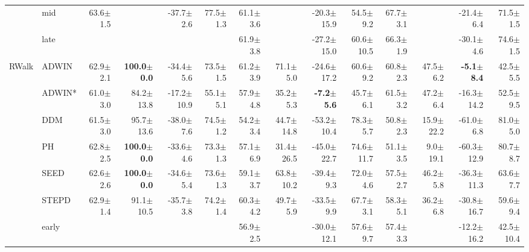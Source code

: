 \begin{tabular}{llrrrrrrrrrrrr}
 & mid & 63.6\tiny{$\pm$1.5} &  & -37.7\tiny{$\pm$2.6} & 77.5\tiny{$\pm$1.3} & 61.1\tiny{$\pm$3.6} &  & -20.3\tiny{$\pm$15.9} & 54.5\tiny{$\pm$9.2} & 67.7\tiny{$\pm$3.1} &  & -21.4\tiny{$\pm$6.4} & 71.5\tiny{$\pm$1.5} \\
 & late &  &  &  &  & 61.9\tiny{$\pm$3.8} &  & -27.2\tiny{$\pm$15.0} & 60.6\tiny{$\pm$10.5} & 66.3\tiny{$\pm$1.9} &  & -30.1\tiny{$\pm$4.6} & 74.6\tiny{$\pm$1.5} \\
\midrule
\multirow[t]{9}{*}{RWalk} & ADWIN & 62.9\tiny{$\pm$2.1} & \textbf{100.0\tiny{$\pm$0.0}} & -34.4\tiny{$\pm$5.6} & 73.5\tiny{$\pm$1.5} & 61.2\tiny{$\pm$3.9} & 71.1\tiny{$\pm$5.0} & -24.6\tiny{$\pm$17.2} & 60.6\tiny{$\pm$9.2} & 60.8\tiny{$\pm$2.3} & 47.5\tiny{$\pm$6.2} & \textbf{-5.1\tiny{$\pm$8.4}} & 42.5\tiny{$\pm$5.5} \\
 & ADWIN* & 61.0\tiny{$\pm$3.0} & 84.2\tiny{$\pm$13.8} & -17.2\tiny{$\pm$10.9} & 55.1\tiny{$\pm$5.1} & 57.9\tiny{$\pm$4.8} & 35.2\tiny{$\pm$5.3} & \textbf{-7.2\tiny{$\pm$5.6}} & 45.7\tiny{$\pm$6.1} & 61.5\tiny{$\pm$3.2} & 47.2\tiny{$\pm$6.4} & -16.3\tiny{$\pm$14.2} & 52.5\tiny{$\pm$9.5} \\
 & DDM & 61.5\tiny{$\pm$3.0} & 95.7\tiny{$\pm$13.6} & -38.0\tiny{$\pm$7.6} & 74.5\tiny{$\pm$1.2} & 54.2\tiny{$\pm$3.4} & 44.7\tiny{$\pm$14.8} & -53.2\tiny{$\pm$10.4} & 78.3\tiny{$\pm$5.7} & 50.8\tiny{$\pm$2.3} & 15.9\tiny{$\pm$22.2} & -61.0\tiny{$\pm$6.8} & 81.0\tiny{$\pm$5.0} \\
 & PH & 62.8\tiny{$\pm$2.5} & \textbf{100.0\tiny{$\pm$0.0}} & -33.6\tiny{$\pm$4.6} & 73.3\tiny{$\pm$1.3} & 57.1\tiny{$\pm$6.9} & 31.4\tiny{$\pm$26.5} & -45.0\tiny{$\pm$22.7} & 74.6\tiny{$\pm$11.7} & 51.1\tiny{$\pm$3.5} & 9.0\tiny{$\pm$19.1} & -60.3\tiny{$\pm$12.9} & 80.7\tiny{$\pm$8.7} \\
 & SEED & 62.6\tiny{$\pm$2.6} & \textbf{100.0\tiny{$\pm$0.0}} & -34.6\tiny{$\pm$5.4} & 73.6\tiny{$\pm$1.3} & 59.1\tiny{$\pm$3.7} & 63.8\tiny{$\pm$10.2} & -39.4\tiny{$\pm$9.3} & 72.0\tiny{$\pm$4.6} & 57.5\tiny{$\pm$2.7} & 46.2\tiny{$\pm$5.8} & -36.3\tiny{$\pm$11.3} & 63.6\tiny{$\pm$7.7} \\
 & STEPD & 62.9\tiny{$\pm$1.4} & 91.1\tiny{$\pm$10.5} & -35.7\tiny{$\pm$3.8} & 74.2\tiny{$\pm$1.4} & 60.3\tiny{$\pm$4.2} & 49.7\tiny{$\pm$5.9} & -33.5\tiny{$\pm$9.9} & 67.7\tiny{$\pm$3.1} & 58.3\tiny{$\pm$5.1} & 36.2\tiny{$\pm$6.8} & -30.8\tiny{$\pm$16.7} & 59.6\tiny{$\pm$9.4} \\
 & early &  &  &  &  & 56.9\tiny{$\pm$2.5} &  & -30.0\tiny{$\pm$12.1} & 57.6\tiny{$\pm$9.7} & 57.4\tiny{$\pm$3.3} &  & -12.2\tiny{$\pm$16.2} & 42.5\tiny{$\pm$10.4} \\

\end{tabular}
